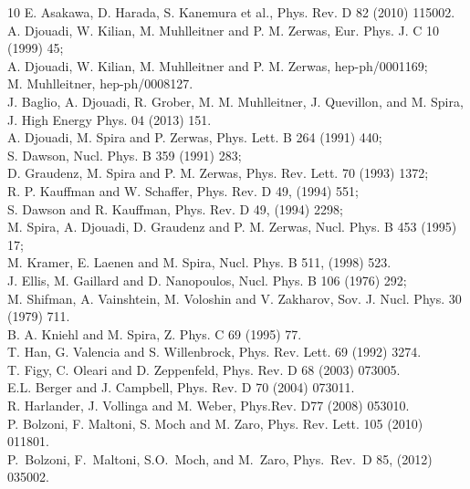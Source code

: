\begin{thebibliography}{10}
E. Asakawa, D. Harada, S. Kanemura et al., Phys. Rev. D 82 (2010) 115002.
\\
A. Djouadi, W. Kilian, M. Muhlleitner and P. M. Zerwas, Eur. Phys. J. C 10 (1999) 45;\\
A. Djouadi, W. Kilian, M. Muhlleitner and P. M. Zerwas, hep-ph/0001169;\\
M. Muhlleitner, hep-ph/0008127.
\\
J. Baglio, A. Djouadi, R. Grober, M. M. Muhlleitner, J. Quevillon, and M. Spira, 
J. High Energy Phys. 04 (2013) 151.
\\
A. Djouadi, M. Spira and P. Zerwas, Phys. Lett. B 264 (1991) 440;\\
S. Dawson, Nucl. Phys. B 359 (1991) 283;\\
D. Graudenz, M. Spira and P. M. Zerwas, Phys. Rev. Lett. 70 (1993) 1372;\\
R. P. Kauffman and W. Schaffer, Phys. Rev. D 49, (1994) 551;\\
S. Dawson and R. Kauffman, Phys. Rev. D 49, (1994) 2298;\\
M. Spira, A. Djouadi, D. Graudenz and P. M. Zerwas, Nucl. Phys. B 453 (1995) 17;\\
M. Kramer, E. Laenen and M. Spira, Nucl. Phys. B 511, (1998) 523.
\\
J. Ellis, M. Gaillard and D. Nanopoulos, Nucl. Phys. B 106 (1976) 292;\\
M. Shifman, A. Vainshtein, M. Voloshin and V. Zakharov, Sov. J. Nucl.  Phys. 30 (1979) 711.
\\
B. A. Kniehl and M. Spira, Z. Phys. C 69 (1995) 77.
\\
T. Han, G. Valencia and S. Willenbrock, Phys. Rev. Lett. 69 (1992) 3274.
\\
T. Figy, C. Oleari and D. Zeppenfeld, Phys. Rev. D 68 (2003) 073005.
\\
E.L. Berger and J. Campbell, Phys. Rev. D 70 (2004) 073011.
\\
R. Harlander, J. Vollinga and M. Weber, Phys.Rev. D77 (2008) 053010.
\\
P. Bolzoni, F. Maltoni, S. Moch and M. Zaro, Phys. Rev. Lett. 105 (2010) 011801.
\\
P.~Bolzoni, F.~Maltoni, S.O.~Moch, and M.~Zaro, Phys.~Rev.~D 85, (2012) 035002.
\\

\end{thebibliography}
